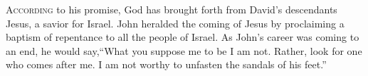 \lettrine[lines=3,loversize=0.15]{A}{ccording} to his promise, God has brought forth from David’s descendants Jesus, a savior for Israel. John heralded the coming of Jesus by proclaiming a baptism of repentance to all the people of Israel. As John’s career was coming to an end, he would say,``What you suppose me to be I am not. Rather, look for one who comes after me. I am not worthy to unfasten the sandals of his feet.”
